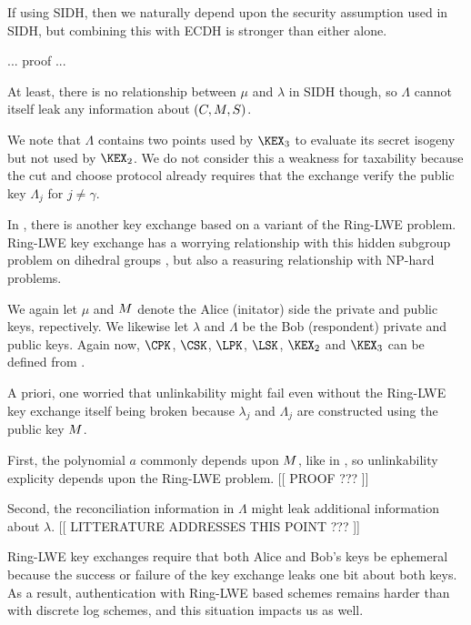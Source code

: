 \documentclass{llncs}
\begin{document}
If using SIDH, then we naturally depend upon the security assumption
used in SIDH, but combining this with ECDH is stronger than either
alone.  

... proof ...

At least, there is no relationship between $\mu$ and $\lambda$ in
SIDH though, so $\Lambda$ cannot itself leak any information about
$(C,M,S)$.  


We note that $\Lambda$ contains two points used by $\KEX_3$ to
evaluate its secret isogeny but not used by $\KEX_2$.  We do not
consider this a weakness for taxability because the cut and choose
protocol already requires that the exchange verify the public
key $\Lambda_j$ for $j \neq \gamma$. 

\smallskip

In \cite{Peikert14,NewHope}, there is another key exchange based on
a variant of the Ring-LWE problem.  Ring-LWE key exchange has a
worrying relationship with this hidden subgroup problem on dihedral
groups \cite{??,??}, but also a reasuring relationship with NP-hard
problems.

We again let $\mu$ and $M$ denote the Alice (initator) side the
private and public keys, repectively.  We likewise let $\lambda$
and $\Lambda$ be the Bob (respondent) private and public keys. 
Again now, $\CPK$, $\CSK$, $\LPK$, $\LSK$, $\KEX_2$ and $\KEX_3$
can be defined from \cite{Peikert14,NewHope}.  

A priori, one worried that unlinkability might fail even without
the Ring-LWE key exchange itself being broken because $\lambda_j$
and $\Lambda_j$ are constructed using the public key $M$. 

First, the polynomial $a$ commonly depends upon $M$, like in
\cite{NewHope}, so unlinkability explicity depends upon the Ring-LWE
problem\cite{}.  [[ PROOF ??? ]]

Second, the reconciliation information in $\Lambda$ might leak
additional information about $\lambda$.  
[[ LITTERATURE ADDRESSES THIS POINT ??? ]]

Ring-LWE key exchanges require that both Alice and Bob's keys be
ephemeral because the success or failure of the key exchange
leaks one bit about both keys\cite{}.  As a result, authentication
with Ring-LWE based schemes remains harder than with discrete log
schemes\cite{??RLWEsig??}, and this situation impacts us as well.
\end{document}
